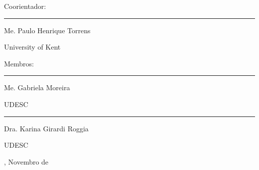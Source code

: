 \begin{folhadeaprovacao}
        {Coorientador:}

	\begin{center}
		\begin{minipage}{8.75cm}
			\begin{flushleft}
				\rule{8.75cm}{0.1mm}

				Me. Paulo Henrique Torrens \par
				University of Kent
			\end{flushleft}
		\end{minipage}
	\end{center}
	
	\vspace*{\baselineskip}
 
    {Membros:} 

    \begin{center}
        \begin{minipage}{8.75cm}
            \begin{flushleft}
                \rule{8.75cm}{0.1mm}
    
                Me. Gabriela Moreira \par
                UDESC
            \end{flushleft}
        \end{minipage}
    \end{center}

	\vspace*{\baselineskip}

    \begin{center}
        \begin{minipage}{8.75cm}
            \begin{flushleft}
                \rule{8.75cm}{0.1mm}
    
                Dra. Karina Girardi Roggia \par
                UDESC
            \end{flushleft}
        \end{minipage}
    \end{center}

    
    \vspace*{\fill}  
    \begin{center}
    {\imprimirlocal, Novembro de \imprimirdata}
	\end{center}
    \vspace*{0.25cm}  
\end{folhadeaprovacao}




